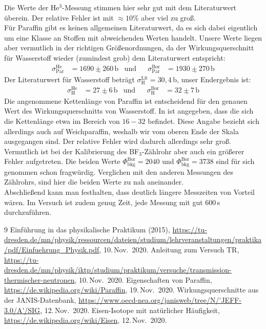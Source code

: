 \documentclass[german, parskip=full]{scrartcl}
\newcommand{\tecxt}{}
\begin{document}
Die Werte der He${}^3$-Messung stimmen hier sehr gut mit dem Literaturwert überein. Der relative Fehler ist mit $\approx 10\%$ aber viel zu groß. \\
Für Paraffin gibt es keinen allgemeinen Literaturwert, da es sich dabei eigentlich um eine Klasse an Stoffen mit abweichenden Werten handelt. Unsere Werte liegen aber vermutlich in der richtigen Größenordnungen, da der Wirkungsquerschnitt für Wasserstoff wieder (zumindest grob) dem Literaturwert entspricht:
\begin{align*}
\sigma_\tecxt\text{Par}^\tecxt\text{He}&=\underline{1690\pm 260\,\tecxt\text{b}} &\tecxt\text{und}&&\sigma_\tecxt\text{Par}^\tecxt\text{Bor}&=\underline{1930\pm 270\,\tecxt\text{b}}
\end{align*}
Der Literaturwert für Wasserstoff beträgt $\sigma_\tecxt\text{H}^\tecxt\text{Lit}=30,4\,$b, unser Endergebnis ist:
\begin{align*}
\sigma_\tecxt\text{H}^\tecxt\text{He}&=\underline{27\pm 6\,\tecxt\text{b}} &\tecxt\text{und}&&\sigma_\tecxt\text{H}^\tecxt\text{Bor}&=\underline{32\pm 7\,\tecxt\text{b}}
\end{align*}
Die angenommene Kettenlänge von Paraffin ist entscheidend für den genauen Wert des Wirkungsquerschnitts von Wasserstoff. In \cite{Paraffin} ist angegeben, dass die sich die Kettenlänge etwa im Bereich von $16-32$ befindet. Diese Angabe bezieht sich allerdings auch auf Weichparaffin, weshalb wir vom oberen Ende der Skala ausgegangen sind. Der relative Fehler wird dadurch allerdings sehr groß.\\
Vermutlich ist bei der Kalibrierung des BF${}_3$-Zählrohr aber auch ein größerer Fehler aufgetreten. Die beiden Werte $\Phi_\tecxt\text{bkg}^\tecxt\text{Bor}=2040$ und $\Phi_\tecxt\text{bkg}^\tecxt\text{Bor}=3738$ sind für sich genommen schon fragwürdig. Verglichen mit den anderen Messungen des Zählrohrs, sind hier die beiden Werte zu nah aneinander.\\
Abschließend kann man festhalten, dass deutlich längere Messzeiten von Vorteil wären. Im Versuch ist zudem genug Zeit, jede Messung mit gut 600\,s durchzuführen. 
\begin{thebibliography}{9}
 Einführung in das physikalische Praktikum (2015), \url{https://tu-dresden.de/mn/physik/ressourcen/dateien/studium/lehrveranstaltungen/praktika/pdf/Einfuehrung_Physik.pdf}, 10.\,Nov.~2020.
 Anleitung zum Versuch TR, \url{https://tu-dresden.de/mn/physik/iktp/studium/praktikum/versuche/transmission-thermischer-neutronen}, 10.\,Nov.~2020.
 Eigenschaften von Paraffin, \url{https://de.wikipedia.org/wiki/Paraffin}, 19.\,Nov.~2020.
 Wirkungsquerschnitte aus der JANIS-Datenbank, \url{https://www.oecd-nea.org/janisweb/tree/N/'JEFF-3.0/A'/SIG}, 12.\,Nov.~2020.
 Eisen-Isotope mit natürlicher Häufigkeit, \url{https://de.wikipedia.org/wiki/Eisen}, 12.\,Nov.~2020.
\end{thebibliography}
\end{document}
